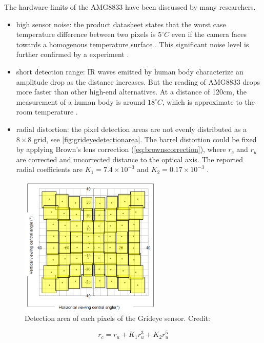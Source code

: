 The hardware limits of the AMG8833 have been discussed by many researchers.
\begin{itemize}
  \item high sensor noise: the product datasheet states that the worst case temperature difference between two pixels is $5^\circ C$ even if the camera faces towards a homogenous temperature surface \cite{grideye_datasheet}. This significant noise level is further confirmed by a experiment \cite{firstflow}.
  \item short detection range: IR waves emitted by human body characterize an amplitude drop as the distance increases. But the reading of AMG8833 drops more faster than other high-end alternatives. At a distance of 120cm, the measurement of a human body is around $18^\circ C$, which is approximate to the room temperature \cite{firstflow}.
  \item radial distortion: the pixel detection areas are not evenly distributed as a $8\times8$ grid, see \autoref{fig:grideyedetectionarea}. The barrel distortion could be fixed by applying Brown's lens correction (\autoref{eq:brownscorrection}), where $r_c$ and $r_u$ are corrected and uncorrected distance to the optical axis. The reported radial coefficients are $K_1=7.4\times 10^{-3}$ and $K_2=0.17\times10^{-3}$ \cite{gonzalez2013using}.
\end{itemize}
\begin{figure}
  \centering
  \includegraphics[width=0.6\textwidth]{figures/grideye_detectionarea.PNG}
  \caption{Detection area of each pixels of the Grideye sensor. Credit: \cite{grideye_datasheet}}\label{fig:grideyedetectionarea}
\end{figure}
\begin{equation}\label{eq:brownscorrection}
  r_c = r_u + K_1r_u^3+K_2r_u^5
\end{equation}
